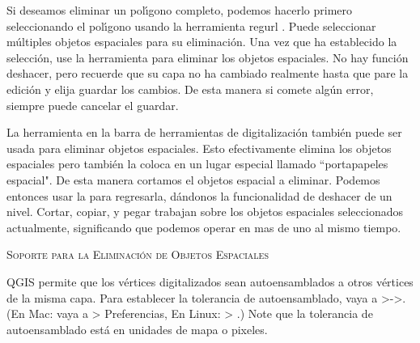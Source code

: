
Si deseamos eliminar un pol\'{\i}gono completo, podemos hacerlo primero seleccionando 
el pol\'{\i}gono usando la herramienta regurl . Puede seleccionar 
m\'ultiples objetos espaciales para su eliminaci\'on. Una vez que ha establecido la selecci\'on, use la 
herramienta  para eliminar los objetos espaciales. No hay funci\'on deshacer, 
pero recuerde que su capa no ha cambiado realmente hasta que pare la edici\'on y elija 
guardar los cambios. De esta manera si comete alg\'un error, siempre puede cancelar el guardar.

La herramienta  en la barra de herramientas de digitalizaci\'on también puede
ser usada para eliminar objetos espaciales. Esto efectivamente elimina los objetos espaciales pero
también la coloca en un lugar especial llamado ``portapapeles espacial". De esta manera cortamos el objetos espacial a eliminar. 
Podemos entonces usar la  para regresarla, d\'andonos la funcionalidad de deshacer de un nivel. 
Cortar, copiar, y pegar trabajan sobre los objetos espaciales seleccionados actualmente, 
significando que podemos operar en mas de uno al mismo tiempo.

\begin{Tip}[ht]\caption{\textsc{Soporte para la Eliminaci\'on de Objetos Espaciales}}
\end{Tip}

QGIS permite que los v\'ertices digitalizados sean autoensamblados a otros v\'ertices de la misma capa. Para 
establecer la tolerancia de autoensamblado, vaya a
>->.
(En Mac: vaya a   > Preferencias, En Linux:  > .)
Note que la tolerancia de autoensamblado est\'a en unidades de mapa o pixeles.


